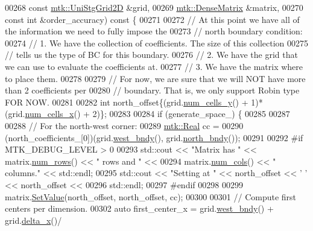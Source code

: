 \begin{DoxyCode}
00268     \textcolor{keyword}{const} \hyperlink{classmtk_1_1UniStgGrid2D}{mtk::UniStgGrid2D} &grid,
00269     \hyperlink{classmtk_1_1DenseMatrix}{mtk::DenseMatrix} &matrix,
00270     \textcolor{keyword}{const} \textcolor{keywordtype}{int} &order\_accuracy)\textcolor{keyword}{ const }\{
00271 
00272   \textcolor{comment}{// At this point we have all of the information we need to fully impose the}
00273   \textcolor{comment}{// north boundary condition:}
00274   \textcolor{comment}{// 1. We have the collection of coefficients. The size of this collection}
00275   \textcolor{comment}{// tells us the type of BC for this boundary.}
00276   \textcolor{comment}{// 2. We have the grid that we can use to evaluate the coefficients at.}
00277   \textcolor{comment}{// 3. We have the matrix where to place them.}
00278 
00279   \textcolor{comment}{// For now, we are sure that we will NOT have more than 2 coefficients per}
00280   \textcolor{comment}{// boundary. That is, we only support Robin type FOR NOW.}
00281 
00282   \textcolor{keywordtype}{int} north\_offset\{(grid.\hyperlink{classmtk_1_1UniStgGrid2D_aed05a801cc9a76dba0ff203cea58a61a}{num\_cells\_y}() + 1)*(grid.\hyperlink{classmtk_1_1UniStgGrid2D_a2d182866a398aba8e4829590e85bf939}{num\_cells\_x}() + 2)\};
00283 
00284   \textcolor{keywordflow}{if} (generate\_space\_) \{
00285 
00287 
00288     \textcolor{comment}{// For the north-west corner:}
00289     \hyperlink{group__c01-roots_gac080bbbf5cbb5502c9f00405f894857d}{mtk::Real} cc =
00290       (north\_coefficients\_[0])(grid.\hyperlink{classmtk_1_1UniStgGrid2D_af2b1712387ded85edaf2b64617d3fc13}{west\_bndy}(), grid.\hyperlink{classmtk_1_1UniStgGrid2D_afe1ead253cdeb5503e0489eba8fd84e2}{north\_bndy}());
00291 
00292 \textcolor{preprocessor}{    #if MTK\_DEBUG\_LEVEL > 0}
00293     std::cout << \textcolor{stringliteral}{"Matrix has "} << matrix.\hyperlink{classmtk_1_1DenseMatrix_a53f3afb3b6a8d21854458aaa9663cc74}{num\_rows}() << \textcolor{stringliteral}{" rows and "} <<
00294       matrix.\hyperlink{classmtk_1_1DenseMatrix_a41747502d468c6728a4be31501b16e0e}{num\_cols}() << \textcolor{stringliteral}{" columns."} << std::endl;
00295     std::cout << \textcolor{stringliteral}{"Setting at "} << north\_offset << \textcolor{charliteral}{' '} << north\_offset <<
00296       std::endl;
00297 \textcolor{preprocessor}{    #endif}
00298 
00299     matrix.\hyperlink{classmtk_1_1DenseMatrix_a784ce5784109ac86bfb9d8562b334b13}{SetValue}(north\_offset, north\_offset, cc);
00300 
00301     \textcolor{comment}{// Compute first centers per dimension.}
00302     \textcolor{keyword}{auto} first\_center\_x = grid.\hyperlink{classmtk_1_1UniStgGrid2D_af2b1712387ded85edaf2b64617d3fc13}{west\_bndy}() + grid.\hyperlink{classmtk_1_1UniStgGrid2D_aca4710004c4a7da6a9e8fd6ab32a691f}{delta\_x}()/

\end{DoxyCode}

